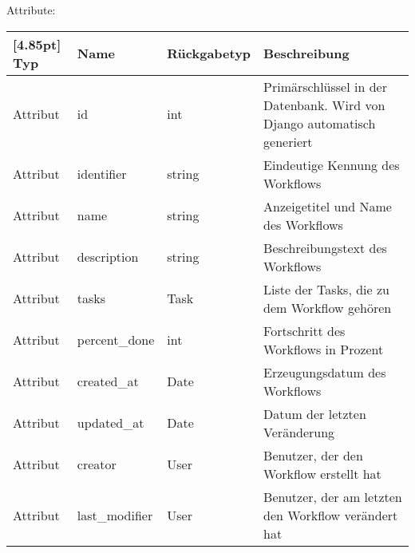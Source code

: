             Attribute:
            \begin{center}
            	\renewcommand{\arraystretch}{1.5}
	            \setlength\tabcolsep{5pt}
            	\begin{tabularx}{\textwidth}{|l|l|l|X|}
            		\hline
                    \rowcolor[gray]{0.75}[4.85pt]            		
            	    Typ & Name & Rückgabetyp & Beschreibung \\ \hline
            		Attribut & id & int & Primärschlüssel in der Datenbank. Wird von Django automatisch generiert \\ \hline
					Attribut & identifier & string & Eindeutige Kennung des Workflows\\ \hline
					Attribut & name & string & Anzeigetitel und Name des Workflows\\ \hline
					Attribut & description & string & Beschreibungstext des Workflows\\ \hline				Attribut & tasks & Task & Liste der Tasks, die zu dem Workflow gehören\\ \hline
					Attribut & percent\_done & int & Fortschritt des Workflows in Prozent\\ \hline
					Attribut & created\_at & Date & Erzeugungsdatum des Workflows \\ \hline
					Attribut & updated\_at & Date & Datum der letzten Veränderung \\ \hline 
					Attribut & creator & User & Benutzer, der den Workflow erstellt hat\\ \hline
					Attribut & last\_modifier & User & Benutzer, der am letzten den Workflow verändert hat\\ \hline
					
					\hline            		
            	\end{tabularx}
            \end{center}

